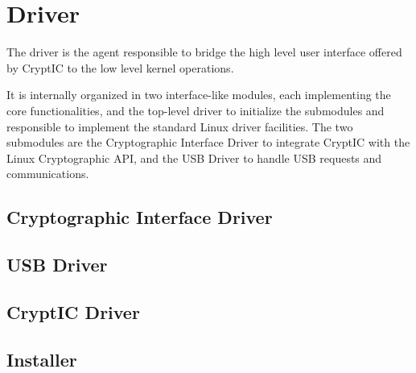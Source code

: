 \section{Driver}
The driver is the agent responsible to bridge the high level user interface offered by CryptIC to the low level kernel operations.

It is internally organized in two interface-like modules, each implementing the core functionalities, and the top-level driver to initialize the submodules and responsible to implement the standard Linux driver facilities. The two submodules are the Cryptographic Interface Driver to integrate CryptIC with the Linux Cryptographic API, and the USB Driver to handle USB requests and communications.

\subsection{Cryptographic Interface Driver}
\subsection{USB Driver}
\subsection{CryptIC Driver}
\subsection{Installer}
